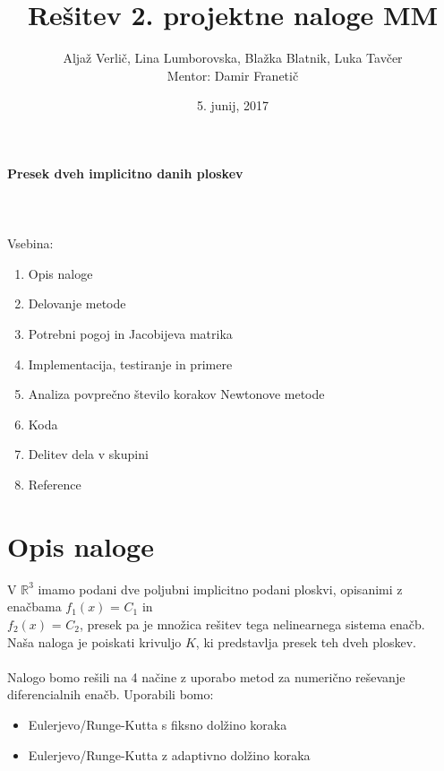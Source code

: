 \documentclass[]{article}
\title{Rešitev 2. projektne naloge MM}
\author{Aljaž Verlič, Lina Lumborovska, Blažka Blatnik, Luka Tavčer \\
	Mentor: Damir Franetič}
\date{5. junij, 2017}
\begin{document}
\maketitle
\renewcommand{\abstractname}{Uvod}


\textbf{\LARGE{Presek dveh implicitno danih ploskev}} \\\\\\\\
Vsebina:
\begin{enumerate}
	\item Opis naloge
	\item Delovanje metode
	\item Potrebni pogoj in Jacobijeva matrika
	\item Implementacija, testiranje in primere
	\item Analiza povpre\v{c}no \v{s}tevilo korakov Newtonove metode
	\item Koda
	\item Delitev dela v skupini
	\item Reference
\end{enumerate} 
\newpage

\section{Opis naloge}
	V $\mathbb{R}^3$ imamo podani dve poljubni implicitno podani ploskvi, opisanimi z enačbama $f_{1}(x)$ = $C_{1}$ in\\ $f_{2}(x)$ = $C_{2}$, presek pa je množica rešitev tega nelinearnega sistema enačb.\\
	Naša naloga je poiskati krivuljo $K$, ki predstavlja presek teh dveh ploskev. \\ \\
	Nalogo bomo rešili na 4 načine z uporabo metod za numerično reševanje diferencialnih enačb. Uporabili bomo:
	\begin{itemize}  
		\item Eulerjevo/Runge-Kutta s fiksno dolžino koraka
		\item Eulerjevo/Runge-Kutta z adaptivno dolžino koraka
	\end{itemize}
\end{document}
